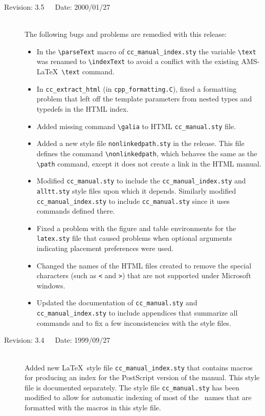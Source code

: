 \documentclass[11pt]{article}
\begin{document}
\begin{description}
    \item[Revision: 3.5~~~Date: 2000/01/27]~\\[3mm]
    The following bugs and problems are remedied with this release:
    \begin{itemize}
       \item In the \verb|\parseText| macro of \verb|cc_manual_index.sty| the
             variable \verb|\text| was renamed to \verb|\indexText| to avoid
             a conflict with the existing AMS-\LaTeX\ \verb|\text| command.
       \item In \verb|cc_extract_html| (in \verb|cpp_formatting.C|), fixed a
             formatting problem that left off the template parameters from
             nested types and typedefs in the HTML index.
       \item Added missing command \verb|\galia| to HTML \verb|cc_manual.sty|
             file.
       \item Added a new style file {\tt nonlinkedpath.sty} in the release.
             This file defines the command \verb|\nonlinkedpath|, which
             behaves the same as the \verb|\path| command, except it
             does not create a link in the HTML manual.
       \item Modified {\tt cc\_manual.sty} to include the
             {\tt cc\_manual\_index.sty} and {\tt alltt.sty} style files upon
             which it depends.  Similarly modified {\tt cc\_manual\_index.sty}
             to include {\tt cc\_manual.sty} since it uses commands defined
             there.
       \item Fixed a problem with the figure and table environments for
             the {\tt latex.sty} file that caused problems when optional
             arguments indicating placement preferences were used.
       \item Changed the names of the HTML files created to remove the
             special characters (such as \verb|<| and \verb|>|) that are
             not supported under Microsoft windows.
       \item Updated the documentation of {\tt cc\_manual.sty} and
             {\tt cc\_manual\_index.sty} to include
             appendices that summarize all commands and to fix a few
             inconsistencies with the style files.
    \end{itemize}

    \item[Revision: 3.4~~~Date: 1999/09/27]~\\[3mm]
    Added new \LaTeX\ style file \verb|cc_manual_index.sty| that contains
    macros for producing an index for the PostScript version of the manual.
    This style file is documented separately.
    The style file \verb|cc_manual.sty| has been modified to allow for
    automatic indexing of most of the \CC\ names that are formatted with the
    macros in this style file.


\end{description}
\end{document}
